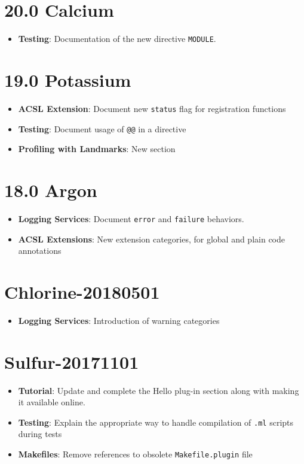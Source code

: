 \section*{20.0 Calcium}
\begin{itemize}
\item \textbf{Testing}: Documentation of the new directive \texttt{MODULE}.
\end{itemize}

\section*{19.0 Potassium}
\begin{itemize}
\item \textbf{ACSL Extension}: Document new \texttt{status} flag for registration functions
\item \textbf{Testing}: Document usage of \texttt{@@} in a directive
\item \textbf{Profiling with Landmarks}: New section
\end{itemize}

\section*{18.0 Argon}
\begin{itemize}
\item \textbf{Logging Services}: Document \texttt{error} and \texttt{failure} behaviors.
\item \textbf{ACSL Extensions}: New extension categories, for global and plain code annotations
\end{itemize}

\section*{Chlorine-20180501}

\begin{itemize}
\item \textbf{Logging Services}: Introduction of warning categories
\end{itemize}

\section*{Sulfur-20171101}
\begin{itemize}
\item \textbf{Tutorial}: Update and complete the Hello plug-in section
along with making it available online.
\item \textbf{Testing}: Explain the appropriate way to handle compilation
of \texttt{.ml} scripts during tests
\item \textbf{Makefiles}: Remove references to obsolete
\texttt{Makefile.plugin} file
\end{itemize}

